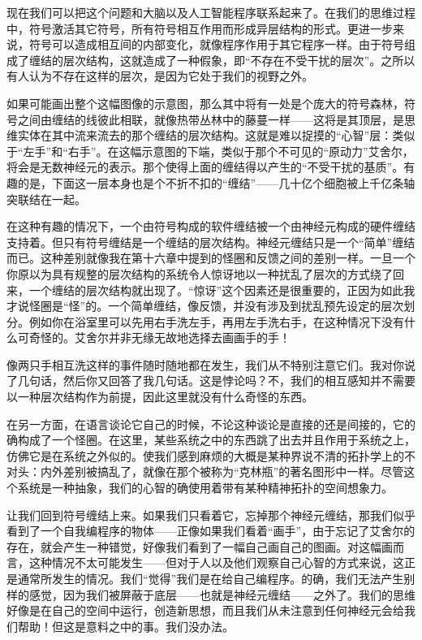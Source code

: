 现在我们可以把这个问题和大脑以及人工智能程序联系起来了。在我们的思维过程中，符号激活其它符号，所有符号相互作用而形成异层结构的形式。更进一步来说，符号可以造成相互间的内部变化，就像程序作用于其它程序一样。由于符号组成了缠结的层次结构，这就造成了一种假象，即“不存在不受干扰的层次”。之所以有人认为不存在这样的层次，是因为它处于我们的视野之外。

如果可能画出整个这幅图像的示意图，那么其中将有一处是个庞大的符号森林，符号之间由缠结的线彼此相联，就像热带丛林中的藤蔓一样——这将是其顶层，是思维实体在其中流来流去的那个缠结的层次结构。这就是难以捉摸的“心智”层：类似于“左手”和“右手”。在这幅示意图的下端，类似于那个不可见的“原动力”艾舍尔，将会是无数神经元的表示。那个使得上面的缠结得以产生的“不受干扰的基质”。有趣的是，下面这一层本身也是个不折不扣的“缠结”——几十亿个细胞被上千亿条轴突联结在一起。

在这种有趣的情况下，一个由符号构成的软件缠结被一个由神经元构成的硬件缠结支持着。但只有符号缠结是一个缠结的层次结构。神经元缠结只是一个“简单”缠结而已。这种差别就像我在第十六章中提到的怪圈和反馈之间的差别一样。一旦一个你原以为具有规整的层次结构的系统令人惊讶地以一种扰乱了层次的方式绕了回来，一个缠结的层次结构就出现了。“惊讶”这个因素还是很重要的，正因为如此我才说怪圈是“怪”的。一个简单缠结，像反馈，并没有涉及到扰乱预先设定的层次划分。例如你在浴室里可以先用右手洗左手，再用左手洗右手，在这种情况下没有什么可奇怪的。艾舍尔并非无缘无故地选择去画画手的手！

像两只手相互洗这样的事件随时随地都在发生，我们从不特别注意它们。我对你说了几句话，然后你又回答了我几句话。这是悖论吗？不，我们的相互感知并不需要以一种层次结构作为前提，因此这里就没有什么奇怪的东西。

在另一方面，在语言谈论它自己的时候，不论这种谈论是直接的还是间接的，它的确构成了一个怪圈。在这里，某些系统之中的东西跳了出去并且作用于系统之上，仿佛它是在系统之外似的。使我们感到麻烦的大概是某种界说不清的拓扑学上的不对头：内外差别被搞乱了，就像在那个被称为“克林瓶”的著名图形中一样。尽管这个系统是一种抽象，我们的心智的确使用着带有某种精神拓扑的空间想象力。

让我们回到符号缠结上来。如果我们只看着它，忘掉那个神经元缠结，那我们似乎看到了一个自我编程序的物体——正像如果我们看着“画手”，由于忘记了艾舍尔的存在，就会产生一种错觉，好像我们看到了一幅自己画自己的图画。对这幅画而言，这种情况不太可能发生——但对于人以及他们观察自己心智的方式来说，这正是通常所发生的情况。我们“觉得”我们是在给自己编程序。的确，我们无法产生别样的感觉，因为我们被屏蔽于底层——也就是神经元缠结——之外了。我们的思维好像是在自己的空间中运行，创造新思想，而且我们从未注意到任何神经元会给我们帮助！但这是意料之中的事。我们没办法。

